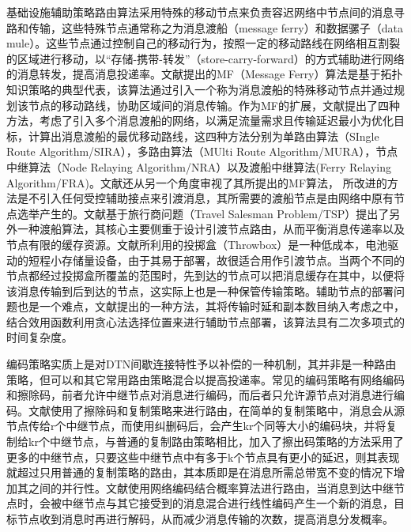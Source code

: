 基础设施辅助策略路由算法采用特殊的移动节点来负责容迟网络中节点间的消息寻路和传输，这些特殊节点通常称之为消息渡船（message ferry）和数据骡子（data mule）。这些节点通过控制自己的移动行为，按照一定的移动路线在网络相互割裂的区域进行移动，以“存储-携带-转发”（store-carry-forward）的方式辅助进行网络的消息转发，提高消息投递率。文献提出的MF（Message Ferry）算法是基于拓扑知识策略的典型代表，该算法通过引入一个称为消息渡船的特殊移动节点并通过规划该节点的移动路线，协助区域间的消息传输。作为MF的扩展，文献提出了四种方法，考虑了引入多个消息渡船的网络，以满足流量需求且传输延迟最小为优化目标，计算出消息渡船的最优移动路线，这四种方法分别为单路由算法（SIngle Route Algorithm/SIRA），多路由算法（MUlti Route Algorithm/MURA），节点中继算法（Node Relaying Algorithm/NRA）以及渡船中继算法(Ferry Relaying Algorithm/FRA)。文献还从另一个角度审视了其所提出的MF算法， 所改进的方法是不引入任何受控辅助接点来引渡消息，其所需要的渡船节点是由网络中原有节点选举产生的。文献基于旅行商问题（Travel Salesman Problem/TSP）提出了另外一种渡船算法，其核心主要侧重于设计引渡节点路由，从而平衡消息传递率以及节点有限的缓存资源。文献所利用的投掷盒（Throwbox）是一种低成本，电池驱动的短程小存储量设备，由于其易于部署，故很适合用作引渡节点。当两个不同的节点都经过投掷盒所覆盖的范围时，先到达的节点可以把消息缓存在其中，以便将该消息传输到后到达的节点，这实际上也是一种保管传输策略。辅助节点的部署问题也是一个难点，文献提出的一种方法，其将传输时延和副本数目纳入考虑之中，结合效用函数利用贪心法选择位置来进行辅助节点部署，该算法具有二次多项式的时间复杂度。


编码策略实质上是对DTN间歇连接特性予以补偿的一种机制，其并非是一种路由策略，但可以和其它常用路由策略混合以提高投递率。常见的编码策略有网络编码和擦除码，前者允许中继节点对消息进行编码，而后者只允许源节点对消息进行编码。文献使用了擦除码和复制策略来进行路由，在简单的复制策略中，消息会从源节点传给r个中继节点，而使用纠删码后，会产生kr个同等大小的编码块，并将复制给kr个中继节点，与普通的复制路由策略相比，加入了擦出码策略的方法采用了更多的中继节点，只要这些中继节点中有多于k个节点具有更小的延迟，则其表现就超过只用普通的复制策略的路由，其本质即是在消息所需总带宽不变的情况下增加其之间的并行性。文献使用网络编码结合概率算法进行路由，当消息到达中继节点时，会被中继节点与其它接受到的消息混合进行线性编码产生一个新的消息，目标节点收到消息时再进行解码，从而减少消息传输的次数，提高消息分发概率。


